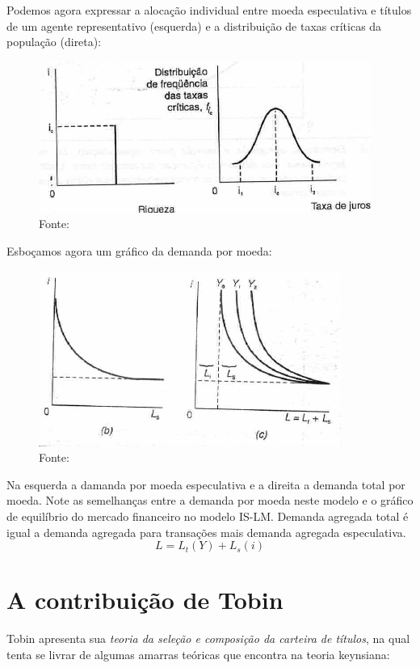 \documentclass[12pt,a4paper,oneside,brazil]{abntex2}
\begin{document}
Podemos agora expressar a alocação individual entre moeda especulativa e títulos de um agente representativo (esquerda) e a distribuição de taxas críticas da população (direta):
\begin{figure}[h]
\includegraphics[scale=1]{Decisoes individuais.PNG}
\centering
\caption{Fonte: \cite[p. 77]{rossetti98}}
\end{figure}

Esboçamos agora um gráfico da demanda por moeda:

\begin{figure}
\includegraphics[scale=1]{MD.PNG}
\centering
\caption{Fonte: \cite[p. 79]{rossetti98}}
\end{figure}

Na esquerda a damanda por moeda especulativa e a direita a demanda total por moeda. Note as semelhanças entre a demanda por moeda neste modelo e o gráfico de equilíbrio do mercado financeiro no modelo IS-LM. Demanda agregada total é igual a demanda agregada para transações mais demanda agregada especulativa.
\[ L = L_t(Y) + L_s(i)\]

\section{A contribuição de Tobin}
Tobin apresenta sua \emph{teoria da seleção e composição da carteira de títulos}, na qual tenta se livrar de algumas amarras teóricas que encontra na teoria keynsiana:
\end{document}
